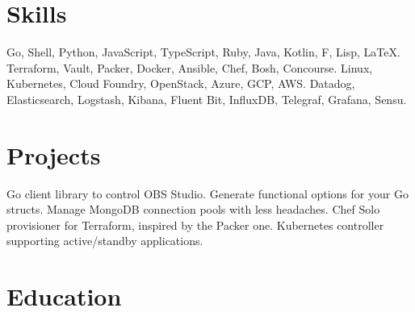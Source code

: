 \documentclass[10pt,letterpaper,sans]{moderncv} %
\newcommand{\Fsharp}{F\nolinebreak[4]\raisebox{.4ex}{\texttt{\#}}}
\begin{document}
\section{Skills}
  {Go, Shell, Python, JavaScript, TypeScript, Ruby, Java, Kotlin, \Fsharp{}, Lisp, \LaTeX.}
  {Terraform, Vault, Packer, Docker, Ansible, Chef, Bosh, Concourse.}
  {Linux, Kubernetes, Cloud Foundry, OpenStack, Azure, GCP, AWS.}
  {Datadog, Elasticsearch, Logstash, Kibana, Fluent Bit, InfluxDB, Telegraf, Grafana, Sensu.}

\section{Projects}
  {Go client library to control OBS Studio.}
  {Generate functional options for your Go structs.}
  {Manage MongoDB connection pools with less headaches.}
  {Chef Solo provisioner for Terraform, inspired by the Packer one.}
  {Kubernetes controller supporting active/standby applications.}

\section{Education}
\end{document}
